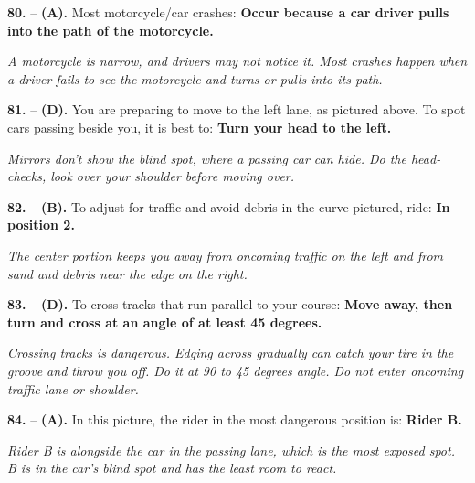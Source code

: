 \begin{minipage}{\linewidth}
\noindent\textbf{80.}  -- \textbf {(A).} Most motorcycle/car crashes:  \textbf {Occur because a car driver pulls into the path of the motorcycle.} \par \textit {A motorcycle is narrow, and drivers may not notice it. Most crashes happen when a driver fails to see the motorcycle and turns or pulls into its path.} \\
\end{minipage}

\begin{minipage}{\linewidth}
\noindent\textbf{81.}  -- \textbf {(D).} You are preparing to move to the left lane, as pictured above. To spot cars passing beside you, it is best to:  \textbf {Turn your head to the left.} \par \textit {Mirrors don't show the blind spot, where a passing car can hide. Do the head-checks, look over your shoulder before moving over.} \\
\end{minipage}

\begin{minipage}{\linewidth}
\noindent\textbf{82.}  -- \textbf {(B).} To adjust for traffic and avoid debris in the curve pictured, ride:  \textbf {In position 2.} \par \textit {The center portion keeps you away from oncoming traffic on the left and from sand and debris near the edge on the right.} \\
\end{minipage}

\begin{minipage}{\linewidth}
\noindent\textbf{83.}  -- \textbf {(D).} To cross tracks that run parallel to your course:  \textbf {Move away, then turn and cross at an angle of at least 45 degrees.} \par \textit {Crossing tracks is dangerous. Edging across gradually can catch your tire in the groove and throw you off. Do it at 90 to 45 degrees angle. Do not enter oncoming traffic lane or shoulder.} \\
\end{minipage}

\begin{minipage}{\linewidth}
\noindent\textbf{84.}  -- \textbf {(A).} In this picture, the rider in the most dangerous position is:  \textbf {Rider B.} \par \textit {Rider B is alongside the car in the passing lane, which is the most exposed spot. B is in the car's blind spot and has the least room to react.} \\
\end{minipage}

